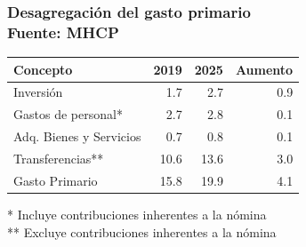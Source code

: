 \begin{frame}
\frametitle{Desagregación del gasto primario \\ \small{Fuente: MHCP}}
\begin{center}
\begin{table}
\centering
\renewcommand{\arraystretch}{1.15}
\begin{tabular}{l r r r}
\hline
\textbf{Concepto} & \textbf{2019} & \textbf{2025} & \textbf{Aumento} \\
\hline
Inversión & 1.7 & 2.7 & 0.9 \\
Gastos de personal\tiny{*} & 2.7 & 2.8 & 0.1 \\
Adq. Bienes y Servicios & 0.7 & 0.8 & 0.1 \\
Transferencias\tiny{**} & 10.6 & 13.6 & 3.0 \\
\hline
Gasto Primario & 15.8 & 19.9 & 4.1 \\
\hline
\end{tabular}
\end{table}

\vspace{0.4cm}
{\tiny
* Incluye contribuciones inherentes a la nómina \\
** Excluye contribuciones inherentes a la nómina
}
\end{center}
\end{frame}